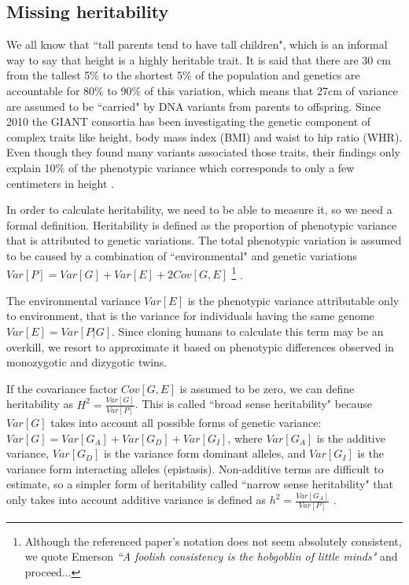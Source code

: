 \subsection{Missing heritability}

We all know that ``tall parents tend to have tall children", which is an informal way to say that height is a highly heritable trait. It is said that there are 30 cm from the tallest 5\% to the shortest 5\% of the population and genetics are accountable for 80\% to 90\% of this variation, which means that 27cm of variance are assumed to be ``carried" by DNA variants from parents to offspring. Since 2010 the GIANT consortia has been investigating the genetic component of complex traits like height, body mass index (BMI) and waist to hip ratio (WHR). Even though they found many variants associated those traits, their findings only explain 10\% of the phenotypic variance which corresponds to only a few centimeters in height \cite{wood2014defining}.

In order to calculate heritability, we need to be able to measure it, so we need a formal definition. Heritability is defined as the proportion of phenotypic variance that is attributed to genetic variations. The total phenotypic variation is assumed to be caused by a combination of ``environmental" and genetic variations $Var[P] = Var[G] + Var[E] + 2 Cov[G, E]$ 
\iffinal
\footnote{Although the referenced paper's notation does not seem absolutely consistent, we quote Emerson \textit{``A foolish consistency is the hobgoblin of little minds"} and proceed...}
\fi
.

The environmental variance $Var[E]$ is the phenotypic variance attributable only to environment, that is the variance for individuals having the same genome $Var[E] = Var[P|G]$. Since cloning humans to calculate this term may be an overkill, we resort to approximate it based on phenotypic differences observed in monozygotic and dizygotic twins.

If the covariance factor $Cov[G, E]$ is assumed to be zero, we can define heritability as $H^2 = \frac{Var[G] }{ Var[P]}$. This is called ``broad sense heritability" because $Var[G]$ takes into account all possible forms of genetic variance: $Var[G] = Var[G_A] + Var[G_D] + Var[G_I]$, where $Var[G_A]$ is the additive variance, $Var[G_D]$ is the variance form dominant alleles, and $Var[G_I]$ is the variance form interacting alleles (epistasis). Non-additive terms are difficult to estimate, so a simpler form of heritability called ``narrow sense heritability" that only takes into account additive variance is defined as $h^2 = \frac{ Var[G_A] }{ Var[P] }$ \cite{zuk2012mystery}.

